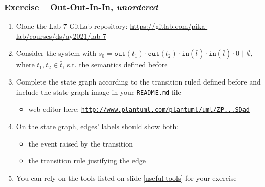 \documentclass[presentation]{beamer}\mode<presentation>{\usetheme{AMSCesenaPurpleAndGold}}
\newcommand{\labN}{7}
\newcommand{\labGroup}{https://gitlab.com/pika-lab/courses/ds/ay2021}
\newcommand{\labRepo}{\labGroup/lab-\labN}
\begin{document}
\begin{frame}[allowframebreaks]
\frametitle{Exercise \currentExercise{} -- Out-Out-In-In, \emph{unordered}}
    \begin{enumerate}
        \item Clone the Lab \labN{} GitLab repository: \url{\labRepo}
        
        \vfill
        
        \item Consider the system with \alert{$s_0 = \mathtt{out}(t_1) \cdot \mathtt{out}(t_2) \cdot \mathtt{in}(\bar t) \cdot \mathtt{in}(\bar t) \cdot 0  \parallel \emptyset$}, where $t_1, t_2 \in \bar{t}$, s.t. the \linda{} semantics defined before
        
        \vfill
    
        \item Complete the state graph according to the transition ruled defined before and include the state graph image in your \alert{\texttt{README.md}} file
        \begin{itemize}
            \item web editor here: \href{
                http://www.plantuml.com/plantuml/uml/ZPBVJl8m6CRFUnNl8Nm9P8m_4488-H0JJp0HE48E6bQneMkNjLFHUE22YGVSXWToBIRU0rTYHvakSpWFbhNls-VtF6_JdbJOLu7Ba5nIxc4Vkt12hd30rAdWQaJl2TXMeZbIM95zIwqO0QemetEPhHvYbq1V13ubFhgc3W7YUce53f5pdtgA2euIIXcXuG41_CVpvS8N0NVwWWc_qnbmX_95jmk2qHkITMB2oPsdLyJHfrQ4CN6B7X6Q_fj1gTG5QI63brORHA0AQXS-5Sk7LLWiKrvGx-lllmMxbrVzFIDf6K8b8Rpaq_F9MAzco71DEu-sUOlKkyqMoOg1sctuM6lQsN0qk1ZFlkhL12t3p8PyjyWAITlmQl0xiAhxUQ7rTdlOXliPgWTsQeQuNa_LZPV9SZpo3vUQeJMCoDo-PkxZnytc4QlwNyUAt92iPzFYUYkE42OYn5ODI3t2Ti8ZqzoCPzJDj3hlYapYMDxADZSUnrzXZt0dSDad
            }{\texttt{http://www.plantuml.com/plantuml/uml/ZP...SDad}}
        \end{itemize}
        
        \vfill
        
        \item On the state graph, edges' labels should show both:
        \begin{itemize}
            \item the event raised by the transition
            \item the transition rule justifying the edge
        \end{itemize}
        
        \vfill
        
        \item You can rely on the tools listed on slide \ref{useful-tools} for your exercise
        

\end{enumerate}
\end{frame}
\end{document}
